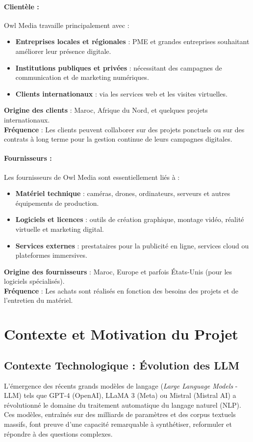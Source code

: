 \paragraph{Clientèle :}
Owl Media travaille principalement avec :
\begin{itemize}
    \item \textbf{Entreprises locales et régionales} : PME et grandes entreprises souhaitant améliorer leur présence digitale.
    \item \textbf{Institutions publiques et privées} : nécessitant des campagnes de communication et de marketing numériques.
    \item \textbf{Clients internationaux} : via les services web et les visites virtuelles.
\end{itemize}
\textbf{Origine des clients} : Maroc, Afrique du Nord, et quelques projets internationaux.\\
\textbf{Fréquence} : Les clients peuvent collaborer sur des projets ponctuels ou sur des contrats à long terme pour la gestion continue de leurs campagnes digitales.

\paragraph{Fournisseurs :}
Les fournisseurs de Owl Media sont essentiellement liés à :
\begin{itemize}
    \item \textbf{Matériel technique} : caméras, drones, ordinateurs, serveurs et autres équipements de production.
    \item \textbf{Logiciels et licences} : outils de création graphique, montage vidéo, réalité virtuelle et marketing digital.
    \item \textbf{Services externes} : prestataires pour la publicité en ligne, services cloud ou plateformes immersives.
\end{itemize}
\textbf{Origine des fournisseurs} : Maroc, Europe et parfois États-Unis (pour les logiciels spécialisés).\\
\textbf{Fréquence} : Les achats sont réalisés en fonction des besoins des projets et de l'entretien du matériel.

\section{Contexte et Motivation du Projet}

\subsection{Contexte Technologique : Évolution des LLM}
L'émergence des récents grands modèles de langage (\textit{Large Language Models} - LLM) tels que GPT-4 (OpenAI), LLaMA 3 (Meta) ou Mistral (Mistral AI) a révolutionné le domaine du traitement automatique du langage naturel (NLP). Ces modèles, entraînés sur des milliards de paramètres et des corpus textuels massifs, font preuve d'une capacité remarquable à synthétiser, reformuler et répondre à des questions complexes.

